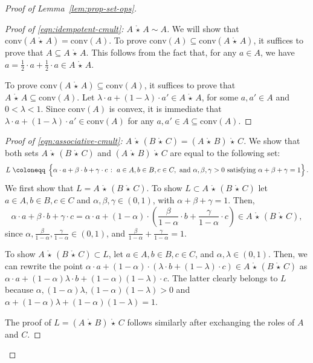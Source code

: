 \documentclass[10pt]{amsart}
\theoremstyle{plain}
\theoremstyle{definition}
\providecommand{\defeq}[0]{\ensuremath{\;\coloneqq\;}\xspace}
\providecommand{\cmult}[0]{\ensuremath{{\,\mathring{\star}\,}}\xspace}
\providecommand{\conv}[1]{\ensuremath{\mathrm{conv}{\left({#1}\right)}\xspace}}
\begin{document}
\begin{proof}[Proof of Lemma~\ref{lem:prop-set-ops}]
\noindent
\begin{proof}[Proof of \eqref{eqn:idempotent-cmult}: $A\cmult A \sim A$]
    We will show that $\conv{A\cmult A} = \conv A$. 
    To prove $\conv{A} \subseteq \conv{A\cmult A}$, it suffices to prove that $A\subseteq A\cmult A$. 
    This follows from the fact that, for any $a\in A$, we have
    $a = \frac12\cdot a + \frac12\cdot a \in A\cmult A$. 
    
    To prove $\conv{A \cmult A} \subseteq \conv{A}$, it suffices to prove that $A\cmult A \subseteq \conv A$. 
    Let $\lambda\cdot a + (1-\lambda)\cdot a' \in A\cmult A$, for some  $a,a'\in A$ and $0<\lambda<1$.
    Since $\conv A$ is convex, it is immediate that $\lambda\cdot a + (1-\lambda)\cdot a' \in \conv A$ for any $a,a'\in A\subseteq \conv A$. 
\end{proof}


\begin{proof}[Proof of \eqref{eqn:associative-cmult}: $A\cmult (B\cmult C)=(A\cmult B)\cmult C$] 
We show that both sets $A\cmult (B\cmult C)$ and $(A\cmult B)\cmult C$ are equal to the following set:
 $$ L\defeq \left\{\vphantom{2^{2^2}}\alpha\cdot a + \beta\cdot b + \gamma\cdot c \;\colon\; a\in A, b\in B, c\in C, \text{ and }\alpha,\beta,\gamma>0 \text{ satisfying } \alpha+\beta+\gamma = 1\right\}.$$
We first show that $L=A\cmult (B\cmult C)$.
To show $L\subset A\cmult (B\cmult C)$ let $a\in A, b\in B,c\in C$ and $\alpha,\beta,\gamma\in (0,1)$, with $\alpha+\beta+\gamma=1$. Then, 
\[
\alpha\cdot a + \beta\cdot b + \gamma\cdot c = \alpha\cdot a+(1-\alpha)\cdot \left(\frac{\beta}{1-\alpha} \cdot b + \frac{\gamma}{1-\alpha}\cdot c\right) \in A\cmult (B\cmult C),
\]
since $\alpha, \frac{\beta}{1-\alpha}, \frac{\gamma}{1-\alpha}\in (0,1)$, and $\frac{\beta}{1-\alpha}+\frac{\gamma}{1-\alpha}=1$.

To show
$A\cmult (B\cmult C)\subset L$, let $a\in A,b\in B,c\in C$, and  $\alpha,\lambda\in (0,1)$. Then, we can rewrite the point $\alpha\cdot a+(1-\alpha)\cdot \left(\lambda\cdot b+(1-\lambda)\cdot c\right)\in A\cmult (B\cmult C)$ as
$\alpha\cdot a+(1-\alpha)\lambda \cdot b+(1-\alpha)(1-\lambda)\cdot c$.
The latter clearly belongs to $L$ because $\alpha, (1-\alpha)\lambda, (1-\alpha)(1-\lambda) > 0$ and 
$\alpha+(1-\alpha)\lambda + (1-\alpha)(1-\lambda) = 1$.\newline

\noindent The proof of $L=(A\cmult B)\cmult C$ follows similarly after exchanging the roles of $A$ and $C$.
 \end{proof}



\end{proof}
\end{document}
